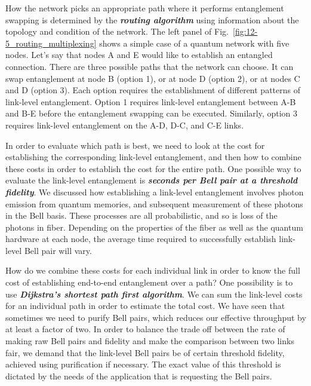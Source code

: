How the network picks an appropriate path where it performs entanglement swapping is determined by the \emph{\textbf{routing algorithm}} using information about the topology and condition of the network.
The left panel of Fig.~\ref{fig:12-5_routing_multiplexing} shows a simple case of a quantum network with five nodes.
Let's say that nodes A and E would like to establish an entangled connection.
There are three possible paths that the network can choose.
It can swap entanglement at node B (option 1), or at node D (option 2), or at nodes C and D (option 3).
Each option requires the establishment of different patterns of link-level entanglement.
Option 1 requires link-level entanglement between A-B and B-E before the entanglement swapping can be executed.
Similarly, option 3 requires link-level entanglement on the A-D, D-C, and C-E links.

In order to evaluate which path is best, we need to look at the cost for establishing the corresponding link-level entanglement, and then how to combine these costs in order to establish the cost for the entire path.
One possible way to evaluate the link-level entanglement is \emph{\textbf{seconds per Bell pair at a threshold fidelity}}.
We discussed how establishing a link-level entanglement involves photon emission from quantum memories, and subsequent measurement of these photons in the Bell basis.
These processes are all probabilistic, and so is loss of the photons in fiber.
Depending on the properties of the fiber as well as the quantum hardware at each node, the average time required to successfully establish link-level Bell pair will vary.

How do we combine these costs for each individual link in order to know the full cost of establishing end-to-end entanglement over a path?
One possibility is to use \emph{\textbf{Dijkstra's shortest path first algorithm}}\label{dijkstra}.
We can sum the link-level costs for an individual path in order to estimate the total cost.
We have seen that sometimes we need to purify Bell pairs, which reduces our effective throughput by at least a factor of two.
In order to balance the trade off between the rate of making raw Bell pairs and fidelity and make the comparison between two links fair, we demand that the link-level Bell pairs be of certain threshold fidelity, achieved using purification if necessary.
The exact value of this threshold is dictated by the needs of the application that is requesting the Bell pairs.

